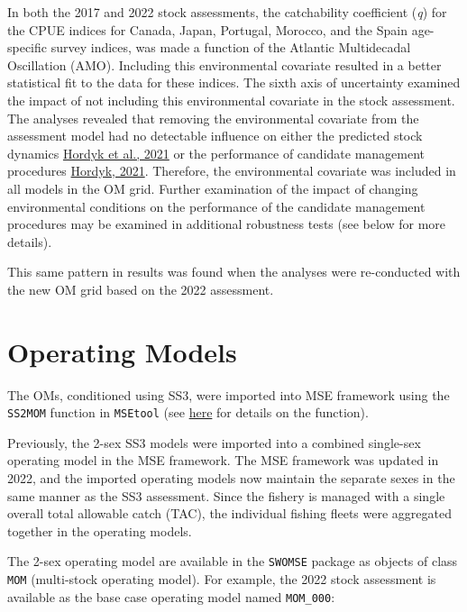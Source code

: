 \documentclass[
]{article}
\begin{document}
In both the 2017 and 2022 stock assessments, the catchability coefficient (\emph{q}) for the CPUE indices for Canada, Japan, Portugal, Morocco, and the Spain age-specific survey indices, was made a function of the Atlantic Multidecadal Oscillation (AMO). Including this environmental covariate resulted in a better statistical fit to the data for these indices. The sixth axis of uncertainty examined the impact of not including this environmental covariate in the stock assessment. The analyses revealed that removing the environmental covariate from the assessment model had no detectable influence on either the predicted stock dynamics \href{https://iccat.github.io/nswo-mse/SCRS_Papers//Hordyk_et_al_SCRS_2021_099.pdf}{Hordyk et al., 2021} or the performance of candidate management procedures \href{https://iccat.github.io/nswo-mse/SCRS_Papers//Hordyk_SCRS_2021_161.pdf}{Hordyk, 2021}. Therefore, the environmental covariate was included in all models in the OM grid. Further examination of the impact of changing environmental conditions on the performance of the candidate management procedures may be examined in additional robustness tests (see below for more details).

This same pattern in results was found when the analyses were re-conducted with the new OM grid based on the 2022 assessment.

\hypertarget{operating-models}{%
\section{Operating Models}\label{operating-models}}

The OMs, conditioned using SS3, were imported into MSE framework using the \texttt{SS2MOM} function in \texttt{MSEtool} (see \href{https://msetool.openmse.com/reference/SS2MOM.html}{here} for details on the function).

Previously, the 2-sex SS3 models were imported into a combined single-sex operating model in the MSE framework. The MSE framework was updated in 2022, and the imported operating models now maintain the separate sexes in the same manner as the SS3 assessment. Since the fishery is managed with a single overall total allowable catch (TAC), the individual fishing fleets were aggregated together in the operating models.

The 2-sex operating model are available in the \texttt{SWOMSE} package as objects of class \texttt{MOM} (multi-stock operating model). For example, the 2022 stock assessment is available as the base case operating model named \texttt{MOM\_000}:
\end{document}
